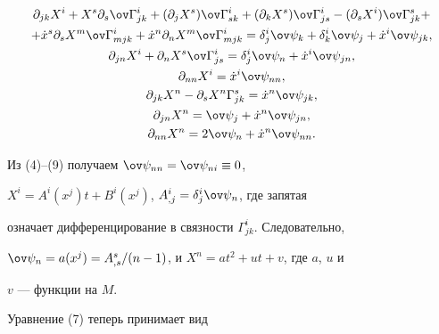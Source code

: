 \begin{gather} 


\partial_{j k}X^i+X^s\partial_s\ov\Gamma^i_{jk}+ 


(\partial_j X^s)\ov\Gamma^i_{s k}+ 


(\partial_k X^s)\ov\Gamma^i_{j s}- 


(\partial_s X^i)\ov\Gamma^s_{jk}+\notag \\


+\Dot x^s\partial_s X^m\ov\Gamma^i_{m j k}+ 


\Dot x^n\partial_n X^m\ov\Gamma^i_{m j k}= 


\delta^i_j\ov\psi_k+\delta^i_k\ov\psi_j+ 


\Dot x^i\ov\psi_{jk},\\ 


% 


\partial_{j n}X^i+\partial_n X^s\ov\Gamma^i_{j s}= 


\delta^i_j\ov\psi_n+\Dot x^i\ov\psi_{j n},\\ 


% 


\partial_{n n}X^i=\Dot x^i\ov\psi_{n n},\\ 


% 


\partial_{jk}X^n-\partial_s X^n\Gamma^s_{jk}= 


\Dot x^n\ov\psi_{jk},\\ 


% 


\partial_{j n}X^n=\ov\psi_j+\Dot x^n\ov\psi_{j n},\\ 


\partial_{n n}X^n=2\ov\psi_n+\Dot x^n\ov\psi_{n n}.


\end{gather} 


 


Из (4)--(9) получаем $\ov\psi_{n n}=\ov\psi_{n i}\equiv0$, 


$X^i=A^i(x^j)t+B^i(x^j)$, $A^i_{,j}=\delta^i_j\ov\psi_n$, где запятая 


означает дифференцирование в связности $\Gamma^i_{jk}$. Следовательно, 


$\ov\psi_n=a(x^j)=A^s_{,s}/(n-1)$, и $X^n=at^2+u t+v$, где $a$, $u$ и 


$v$ --- функции на $M$. 


 


Уравнение (7) теперь принимает вид 


